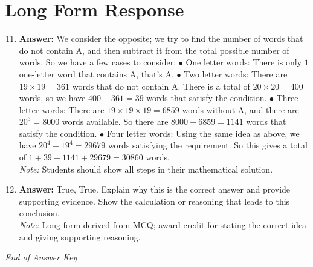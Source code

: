 \documentclass[12pt]{article}
\begin{document}
\section*{Long Form Response}
\begin{enumerate}[label=\arabic*.]
\setcounter{enumi}{10}
\item \textbf{Answer:} We consider the opposite; we try to find the number of words that do not contain A, and then subtract it from the total possible number of words. So we have a few cases to consider: $\bullet$ One letter words: There is only $1$ one-letter word that contains A, that's A. $\bullet$ Two letter words: There are $19\times 19=361$ words that do not contain A. There is a total of $20\times 20=400$ words, so we have $400-361=39$ words that satisfy the condition. $\bullet$ Three letter words: There are $19\times 19\times 19=6859$ words without A, and there are $20^{3}=8000$ words available. So there are $8000-6859=1141$ words that satisfy the condition. $\bullet$ Four letter words: Using the same idea as above, we have $20^{4}-19^{4}=29679$ words satisfying the requirement. So this gives a total of $1+39+1141+29679=\boxed{30860}$ words.
\\ \textit{Note:} Students should show all steps in their mathematical solution.
\item \textbf{Answer:} True, True. Explain why this is the correct answer and provide supporting evidence. Show the calculation or reasoning that leads to this conclusion.
\\ \textit{Note:} Long-form derived from MCQ; award credit for stating the correct idea and giving supporting reasoning.
\end{enumerate}

\vfill
\noindent\textit{End of Answer Key}
\end{document}
